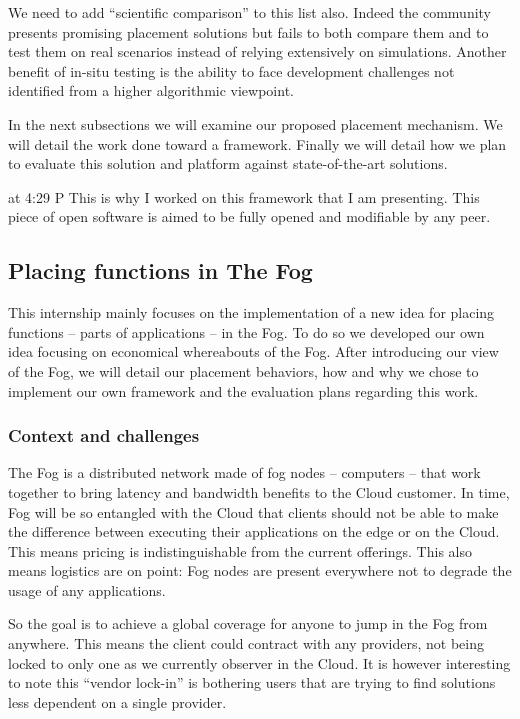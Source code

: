 \documentclass[11pt]{sdm}
\begin{document}
We need to add “scientific comparison” to this list also. Indeed the community presents promising placement solutions but fails to both compare them and to test them on real scenarios instead of relying extensively on simulations. Another benefit of in-situ testing is the ability to face development challenges not identified from a higher algorithmic viewpoint.

In the next subsections we will examine our proposed placement mechanism. We will detail the work done toward a framework. Finally we will detail how we plan to evaluate this solution and platform against state-of-the-art solutions.

 at 4:29 P
This is why I worked on this framework that I am presenting. This piece of open software is aimed to be fully opened and modifiable by any peer.

\subsection{Placing functions in The Fog}

This internship mainly focuses on the implementation of a new idea for placing functions – parts of applications – in the Fog. To do so we developed our own idea focusing on economical whereabouts of the Fog. After introducing our view of the Fog, we will detail our placement behaviors, how and why we chose to implement our own framework and the evaluation plans regarding this work.

\subsubsection{Context and challenges}

The Fog is a distributed network made of fog nodes – computers – that work together to bring latency and bandwidth benefits to the Cloud customer. In time, Fog will be so entangled with the Cloud that clients should not be able to make the difference between executing their applications on the edge or on the Cloud. This means pricing is indistinguishable from the current offerings. This also means logistics are on point: Fog nodes are present everywhere not to degrade the usage of any applications.

So the goal is to achieve a global coverage for anyone to jump in the Fog from anywhere. This means the client could contract with any providers, not being locked to only one as we currently observer in the Cloud. It is however interesting to note this “vendor lock-in” is bothering users that are trying to find solutions less dependent on a single provider.
\end{document}
